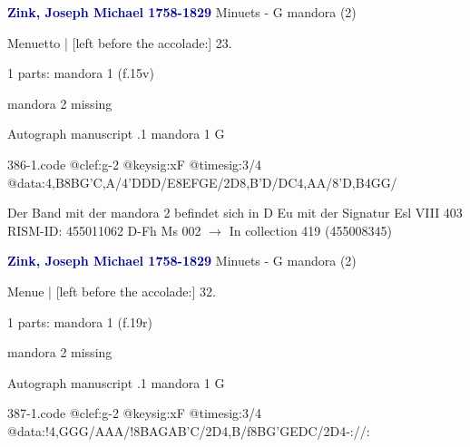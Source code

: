 \documentclass[twocolumn]{book}
\begin{document}
\newline \par \vspace{7pt} \textcolor{darkblue}{\textbf{Zink, Joseph Michael  1758-1829}}
\newline Minuets - G
\newline mandora (2)
\newline \begin{itshape}[f.15v, at left:] Menuetto | [left before the accolade:] 23.\end{itshape} 
\newline \textcolor{darkblue}{}  1 parts: mandora 1  (f.15v)
\newline \begin{small} mandora 2 missing\end{small} 
\newline Autograph manuscript
.1  mandora 1  G  
\begin{filecontents*}{386-1.code}
@clef:g-2
@keysig:xF
@timesig:3/4
@data:4,B8BG'C,A/4'DDD/E8EFGE/2D{8,B'D}/{DC}4,AA/8'D,B4GG/
\end{filecontents*}
\newline
%

\newline Der Band mit der mandora 2 befindet sich in D Eu mit der Signatur Esl VIII 403
\newline RISM-ID: 455011062
\newline D-Fh  Ms 002
\newline $\rightarrow$ In collection 419 (455008345)
      
\newline \par \vspace{7pt} \textcolor{darkblue}{\textbf{Zink, Joseph Michael  1758-1829}}
\newline Minuets - G
\newline mandora (2)
\newline \begin{itshape}[f.19r, at left:] Menue | [left before the accolade:] 32.\end{itshape} 
\newline \textcolor{darkblue}{}  1 parts: mandora 1  (f.19r)
\newline \begin{small} mandora 2 missing\end{small} 
\newline Autograph manuscript
.1  mandora 1  G  
\begin{filecontents*}{387-1.code}
@clef:g-2
@keysig:xF
@timesig:3/4
@data:!4,GGG/AAA/!8BAGAB'C/2D4,B/f8BG'GEDC/2D4-://:
\end{filecontents*}
\newline
%
\end{document}

